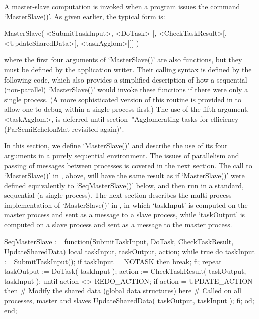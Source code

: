 
A master-slave computation is invoked when a {\GAP}  program  issues  the
command `MasterSlave()'. As given earlier, the typical form is:

MasterSlave( <SubmitTaskInput>, <DoTask> %
  [, <CheckTaskResult>[, <UpdateSharedData>[, <taskAgglom>]]] )

where the first four arguments of `MasterSlave()' are also functions, but
they must be defined by the application writer. Their calling  syntax  is
defined by the following {\GAP} code, which also  provides  a  simplified
description of how  a  sequential  (non-parallel)  `MasterSlave()'  would
invoke these functions if there were  only  a  single  process.  (A  more
sophisticated version of this routine is provided in {\ParGAP}  to  allow
one to debug within a  single  process  first.)  The  use  of  the  fifth
argument, <taskAgglom>, is deferred  until  section~"Agglomerating  tasks
for efficiency (ParSemiEchelonMat revisited again)".

In this section, we define `MasterSlave()' and describe the  use  of  its
four  arguments  in  a  purely  sequential  environment.  The  issues  of
parallelism and passing of messages between processes is covered  in  the
next section. The call to `MasterSlave()' in {\ParGAP}, above, will  have
the same result  as  if  `MasterSlave()'  were  defined  equivalently  to
`SeqMasterSlave()' below, and then run in a standard,  sequential  {\GAP}
(a  single  process).  The  next  section  describes  the   multi-process
implementation of `MasterSlave()' in {\ParGAP}, in which  `taskInput'  is
computed on the master process and sent as a message to a slave  process,
while `taskOutput' is computed on a slave process and sent as  a  message
to the master process.

\begintt
SeqMasterSlave :=
  function(SubmitTaskInput, DoTask, CheckTaskResult, UpdateSharedData)
  local taskInput, taskOutput, action;
  while true do
    taskInput := SubmitTaskInput();
    if taskInput = NOTASK then break; fi;
    repeat
      taskOutput := DoTask( taskInput );
      action := CheckTaskResult( taskOutput, taskInput );
    until action <> REDO_ACTION;
    if action = UPDATE_ACTION then
      # Modify the shared data (global data structures) here
      # Called on all processes, master and slaves
      UpdateSharedData( taskOutput, taskInput );
    fi;
  od;
end;
\endtt

